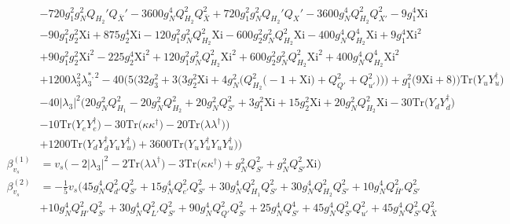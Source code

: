 {\begin{align}
 &-720 g_{1}^{2} g_{N}^{2} Q_{H_2}' Q_{\bar{X}}' -3600 g_{N}^{4} Q_{H_2}^{2} Q_{\bar{X}}^{2} +720 g_{1}^{2} g_{N}^{2} Q_{H_2}' Q_X' -3600 g_{N}^{4} Q_{H_2}^{2} Q_{X'}^{2} -9 g_{1}^{4} \text{Xi} \nonumber \\ 
 &-90 g_{1}^{2} g_{2}^{2} \text{Xi} +875 g_{2}^{4} \text{Xi} -120 g_{1}^{2} g_{N}^{2} Q_{H_2}^{2} \text{Xi} -600 g_{2}^{2} g_{N}^{2} Q_{H_2}^{2} \text{Xi} -400 g_{N}^{4} Q_{H_2}^{4} \text{Xi} +9 g_{1}^{4} \text{Xi}^{2} \nonumber \\ 
 &+90 g_{1}^{2} g_{2}^{2} \text{Xi}^{2} -225 g_{2}^{4} \text{Xi}^{2} +120 g_{1}^{2} g_{N}^{2} Q_{H_2}^{2} \text{Xi}^{2} +600 g_{2}^{2} g_{N}^{2} Q_{H_2}^{2} \text{Xi}^{2} +400 g_{N}^{4} Q_{H_2}^{4} \text{Xi}^{2} \nonumber \\ 
 &+1200 \lambda_{3}^{2} \lambda_{3}^{*,2} -40 \Big(5 \Big(32 g_{3}^{2}  + 3 \Big(3 g_{2}^{2} \text{Xi}  + 4 g_{N}^{2} \Big(Q_{H_2}^{2} \Big(-1 + \text{Xi}\Big) + Q_{Q'}^{2} + Q_{u'}^{2}\Big)\Big)\Big) + g_{1}^{2} \Big(9 \text{Xi}  + 8\Big)\Big)\mbox{Tr}\Big({Y_u  Y_{u}^{\dagger}}\Big) \nonumber \\ 
 &-40 |\lambda_3|^2 \Big(20 g_{N}^{2} Q_{H_1}^{2} -20 g_{N}^{2} Q_{H_2}^{2} +20 g_{N}^{2} Q_{S'}^{2} +3 g_{1}^{2} \text{Xi} +15 g_{2}^{2} \text{Xi} +20 g_{N}^{2} Q_{H_2}^{2} \text{Xi} -30 \mbox{Tr}\Big({Y_d  Y_{d}^{\dagger}}\Big) \nonumber \\ 
 &-10 \mbox{Tr}\Big({Y_e  Y_{e}^{\dagger}}\Big) -30 \mbox{Tr}\Big({\kappa  \kappa^{\dagger}}\Big) -20 \mbox{Tr}\Big({\lambda  \lambda^{\dagger}}\Big) \Big)\nonumber \\ 
 &+1200 \mbox{Tr}\Big({Y_d  Y_{d}^{\dagger}  Y_u  Y_{u}^{\dagger}}\Big) +3600 \mbox{Tr}\Big({Y_u  Y_{u}^{\dagger}  Y_u  Y_{u}^{\dagger}}\Big) \Big)\\ 
\beta_{v_s}^{(1)} & =  
v_s \Big(-2 |\lambda_3|^2  -2 \mbox{Tr}\Big({\lambda  \lambda^{\dagger}}\Big)  -3 \mbox{Tr}\Big({\kappa  \kappa^{\dagger}}\Big)  + g_{N}^{2} Q_{S'}^{2}  + g_{N}^{2} Q_{S'}^{2} \text{Xi} \Big)\\ 
\beta_{v_s}^{(2)} & =  
-\frac{1}{5} v_s \Big(45 g_{N}^{4} Q_{d'}^{2} Q_{S'}^{2} +15 g_{N}^{4} Q_{e'}^{2} Q_{S'}^{2} +30 g_{N}^{4} Q_{H_1}^{2} Q_{S'}^{2} +30 g_{N}^{4} Q_{H_2}^{2} Q_{S'}^{2} +10 g_{N}^{4} Q_{\bar{H}'}^{2} Q_{S'}^{2} \nonumber \\ 
 &+10 g_{N}^{4} Q_{H'}^{2} Q_{S'}^{2} +30 g_{N}^{4} Q_{L'}^{2} Q_{S'}^{2} +90 g_{N}^{4} Q_{Q'}^{2} Q_{S'}^{2} +25 g_{N}^{4} Q_{S'}^{4} +45 g_{N}^{4} Q_{S'}^{2} Q_{u'}^{2} +45 g_{N}^{4} Q_{S'}^{2} Q_{\bar{X}}^{2} \nonumber \\ 

\end{align}}
